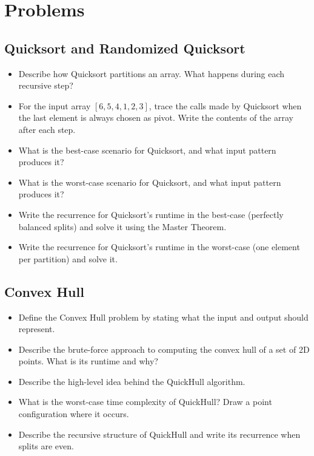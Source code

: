 \documentclass[12pt]{article}
\begin{document}
\section*{Problems}

\subsection*{Quicksort and Randomized Quicksort}
\begin{itemize}[leftmargin=1.5em]
  \item Describe how Quicksort partitions an array. What happens during each recursive step?
  \item For the input array $[6, 5, 4, 1, 2, 3]$, trace the calls made by Quicksort when the last element is always chosen as pivot. Write the contents of the array after each step.
  \item What is the best-case scenario for Quicksort, and what input pattern produces it?
  \item What is the worst-case scenario for Quicksort, and what input pattern produces it?
  \item Write the recurrence for Quicksort's runtime in the best-case (perfectly balanced splits) and solve it using the Master Theorem.
  \item Write the recurrence for Quicksort's runtime in the worst-case (one element per partition) and solve it.
\end{itemize}

\subsection*{Convex Hull}
\begin{itemize}[leftmargin=1.5em]
  \item Define the Convex Hull problem by stating what the input and output should represent.
  \item Describe the brute-force approach to computing the convex hull of a set of 2D points. What is its runtime and why?
  \item Describe the high-level idea behind the QuickHull algorithm.
  \item What is the worst-case time complexity of QuickHull? Draw a point configuration where it occurs.
  \item Describe the recursive structure of QuickHull and write its recurrence when splits are even.
\end{itemize}
\end{document}
